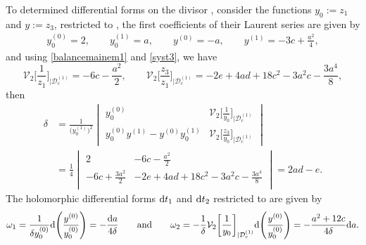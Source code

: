 \documentclass[10pt,a4paper]{amsart}
\numberwithin{equation}{section}
\begin{document}
 To determined differential forms on the divisor
, consider the functions $y_0:=z_1$
and $y:=z_3$, restricted to , the
first coefficients of their Laurent series are given by
 \begin{gather*}
  y_0^{(0)}= 2, \qquad   y_0^{(1)}= a,\qquad
  y^{(0)}= -a, \qquad   y^{(1)}=-3c+\frac{a^2}{4},
 \end{gather*}
 and using \eqref{balancemainem1} and \eqref{syst3},
 we have \[\mathcal{V}_2\biggl[\frac{1}{z_1}\biggr]_{|\mathcal{D}_c^{(1)}}=-6c-\frac{a^2}{2}, \qquad
 \mathcal{V}_2\biggl[\frac{z_3}{z_1}\biggr]_{|\mathcal{D}_c^{(1)}}=-2e+4ad+18c^2-3a^2c-\frac{3a^4}{8},\]
then
\begin{align*}
 \delta &{}= \frac{1}{\bigl(y_0^{(1)}\bigr)^2}
 \begin{vmatrix}
 y_0^{(0)} & \mathcal{V}_2\bigl[\frac{1}{y_0}\bigr]_{|\mathcal{D}_c^{(1)}} \\[1mm]
 y_0^{(0)}y^{(1)}-y^{(0)}y_0^{(1)} & \mathcal{V}_2\bigl[\frac{z_3}{y_0}\bigr]_{|\mathcal{D}_c^{(1)}}
 \end{vmatrix}
 \\
 &{}= \frac{1}{4}
 \begin{vmatrix}
 2 & -6c-\frac{a^2}{2} \\
 -6c+\frac{3a^2}{2} & -2e+4ad+18c^2-3a^2c-\frac{3a^4}{8} \\
 \end{vmatrix}
 = 2ad-e.
\end{align*}
The holomorphic differential forms ${\rm d}t_1$ and ${\rm d}t_2$ restricted to
 are given by
\begin{gather*}
 \omega_1 = \frac{1}{\delta y_0^{(0)}}{\rm d}\Biggl(\frac{y^{(0)}}{y_0^{(0)}}\Biggr)=-\frac{{\rm d}a}{4\delta }
 \qquad \text{and} \qquad
 \omega_2 = -\frac{1}{\delta }\mathcal{V}_2\biggl[\frac{1}{y_0}\biggr]_{|\mathcal{D}_c^{(1)}}
 {\rm d}\Biggl(\frac{y^{(0)}}{y_0^{(0)}}\Biggr)=-\frac{a^2+12c}{4\delta}{\rm d}a.
\end{gather*}
\end{document}

